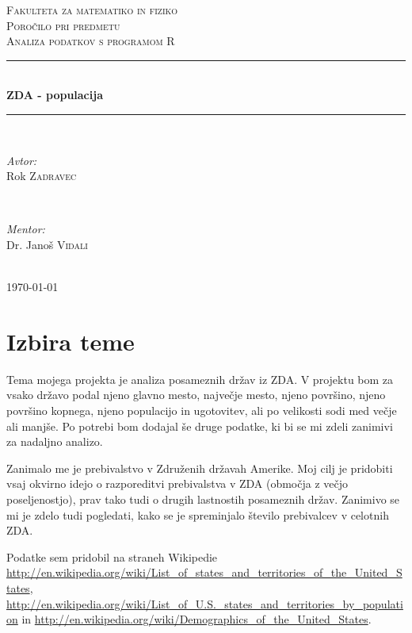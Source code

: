 \documentclass[11pt,a4paper]{article}
\begin{document}
\begin{titlepage}
\newcommand{\HRule}{\rule{\linewidth}{0.5mm}}
\center

\textsc{\LARGE Fakulteta za matematiko in fiziko}\\[3 cm]
\textsc{\Large Poročilo pri predmetu}\\[0.5cm]
\textsc{\large Analiza podatkov s programom R}\\[2 cm]
\HRule \\[0.4cm]
{ \huge \bfseries ZDA - populacija}\\[0.4cm] 
\HRule \\[6 cm]


\begin{minipage}{0.4\textwidth}
\begin{flushleft} \large
\emph{Avtor:}\\
Rok \textsc{Zadravec}
\end{flushleft}
\end{minipage}
~
\begin{minipage}{0.4\textwidth}
\begin{flushright} \large
\emph{Mentor:} \\
Dr. Janoš \textsc{Vidali}
\end{flushright}
\end{minipage}\\[2 cm]

{\large \today}\\[3cm] 


\end{titlepage}

\section{Izbira teme}

Tema mojega projekta je analiza posameznih držav iz ZDA. V projektu bom za vsako državo podal njeno glavno mesto, največje mesto, njeno površino, njeno površino kopnega, njeno populacijo in ugotovitev, ali po velikosti sodi med večje ali manjše. Po potrebi bom dodajal še druge podatke, ki bi se mi zdeli zanimivi za nadaljno analizo.

Zanimalo me je prebivalstvo v Združenih državah Amerike. Moj cilj je pridobiti vsaj okvirno idejo o razporeditvi prebivalstva v ZDA (območja z večjo poseljenostjo), prav tako tudi o drugih lastnostih posameznih držav. Zanimivo se mi je zdelo tudi pogledati, kako se je spreminjalo število prebivalcev v celotnih ZDA.

Podatke sem pridobil na straneh Wikipedie \url{http://en.wikipedia.org/wiki/List_of_states_and_territories_of_the_United_States}, \url{http://en.wikipedia.org/wiki/List_of_U.S._states_and_territories_by_population} in \url{http://en.wikipedia.org/wiki/Demographics_of_the_United_States}.
\end{document}
